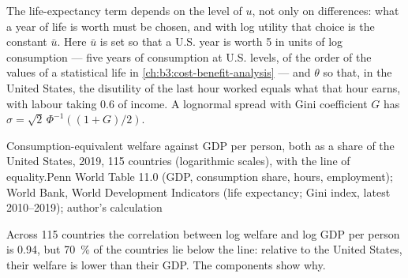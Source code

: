 The life-expectancy term depends on the level of $u$, not only on differences: what
a year of life is worth must be chosen, and with log utility that choice is the
constant $\bar u$. Here $\bar u$ is set so that a U.S. year is worth 5 in units of log consumption ---
five years of consumption at U.S. levels, of the order of the values of a statistical
life in \cref{ch:b3:cost-benefit-analysis} --- and $\theta$ so that, in the United States, the disutility of
the last hour worked equals what that hour earns, with labour taking 0.6 of income. A lognormal
spread with Gini coefficient $G$ has $\sigma = \sqrt2\,\Phi^{-1}((1 + G)/2)$.

\begin{omchart}{Consumption-equivalent welfare against GDP per person, both as a share of the
United States, 2019, 115 countries (logarithmic scales), with the line of equality.}{Penn World
Table 11.0 (GDP, consumption share, hours, employment); World Bank, World Development
Indicators (life expectancy; Gini index, latest 2010--2019); author's calculation}
\end{omchart}

Across 115 countries the correlation between log welfare and log GDP per person is 0.94, but 70~\% of the
countries lie below the line: relative to the United States, their welfare is lower than
their GDP. The components show why.

